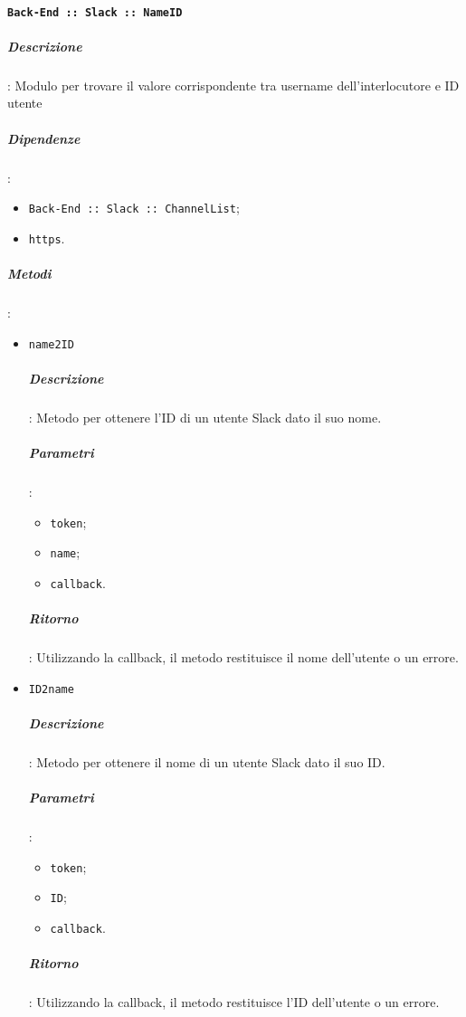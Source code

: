 \documentclass[../DefinizioneDiProdotto_v2.0.0.tex]{subfiles}
\begin{document}
\paragraph{\texttt{Back-End :: Slack :: NameID}}
\subparagraph{Descrizione}: Modulo per trovare il valore corrispondente tra username dell'interlocutore e ID utente
\subparagraph{Dipendenze}:
\begin{itemize}
	\item \texttt{Back-End :: Slack :: ChannelList};
	\item \texttt{https}.
\end{itemize}
\subparagraph{Metodi}:
\begin{itemize}
	\item \texttt{name2ID}
	      \subparagraph{Descrizione}: Metodo per ottenere l'ID di un utente Slack dato il suo nome.
	      \subparagraph{Parametri}:
	      \begin{itemize}
	      	\item \texttt{token};
	      	\item \texttt{name};
	      	\item \texttt{callback}.
	      \end{itemize}
	      \subparagraph{Ritorno}: Utilizzando la callback, il metodo restituisce il nome dell'utente o un errore.
	\item \texttt{ID2name}
	      \subparagraph{Descrizione}: Metodo per ottenere il nome di un utente Slack dato il suo ID.
	      \subparagraph{Parametri}:
	      \begin{itemize}
	      	\item \texttt{token};
	      	\item \texttt{ID};
	      	\item \texttt{callback}.
	      \end{itemize}
	      \subparagraph{Ritorno}: Utilizzando la callback, il metodo restituisce l'ID dell'utente o un errore.
\end{itemize}
\end{document}
